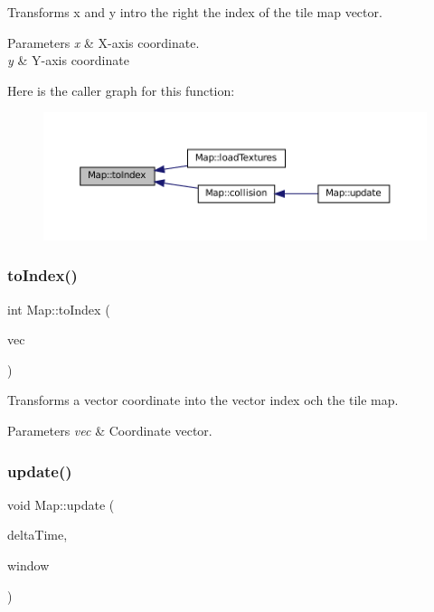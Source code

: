Transforms x and y intro the right the index of the tile map vector. 


\begin{DoxyParams}{Parameters}
{\em x} & X-\/axis coordinate. \\
\hline
{\em y} & Y-\/axis coordinate \\
\hline
\end{DoxyParams}
Here is the caller graph for this function\+:\nopagebreak
\begin{figure}[H]
\begin{center}
\leavevmode
\includegraphics[width=350pt]{classMap_a378ff701ba69cfe800693466f8f3299e_icgraph}
\end{center}
\end{figure}
\mbox{\label{classMap_a52f3ef46020dd2f6544fa2ee8dc9f4ff}} 
\subsubsection{\texorpdfstring{to\+Index()}{toIndex()}\hspace{0.1cm}{\footnotesize\ttfamily [2/2]}}
{\footnotesize\ttfamily int Map\+::to\+Index (\begin{DoxyParamCaption}\item[{sf\+::\+Vector2i}]{vec }\end{DoxyParamCaption})}



Transforms a vector coordinate into the vector index och the tile map. 


\begin{DoxyParams}{Parameters}
{\em vec} & Coordinate vector. \\
\hline
\end{DoxyParams}
\mbox{\label{classMap_a7346023f96a36368daa2d4cafd4523f2}} 
\subsubsection{\texorpdfstring{update()}{update()}}
{\footnotesize\ttfamily void Map\+::update (\begin{DoxyParamCaption}\item[{float}]{delta\+Time,  }\item[{sf\+::\+Render\+Window \&}]{window }\end{DoxyParamCaption})}



